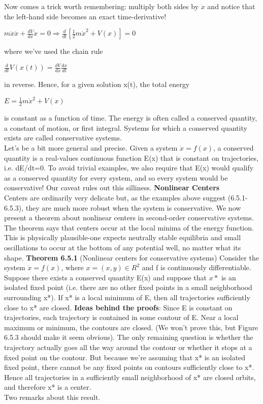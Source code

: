 \documentclass{article}
\newcommand\tab[1][1cm]{\hspace*{#1}}
\begin{document}
Now comes a trick worth remembering: multiply both sides by $\dot{x}$ and notice that the left-hand side becomes an exact time-derivative! 
\begin{center}
$m\dot{x}\ddot{x}+\frac{dV}{dx}\dot{x}=0 \Rightarrow \frac{d}{dt}[\frac{1}{2}m\dot{x}^{2}+V(x)]=0$
\end{center}

where we've used the chain rule
\begin{center}
$\frac{d}{dt}V(x(t))=\frac{dV}{dx}\frac{dx}{dt}$
\end{center}
in reverse. Hence, for a given solution x(t), the total energy
\begin{center}
$E=\frac{1}{2}m\dot{x}^{2}+V(x)$
\end{center}
is constant as a function of time. The energy is often called a conserved quantity, a constant of motion, or first integral. Systems for which a conserved quantity exists are called conservative systems. \\ \tab
Let's be a bit more general and precise. Given a system $\dot{x}=f(x)$, a conserved quantity is a real-values continuous function E(x) that is constant on trajectories, i.e. dE/dt=0. To avoid trivial examples, we also require that E(x) would qualify as a conserved quantity for every system, and so every system would be conservative! Our caveat rules out this silliness. 
\textbf {Nonlinear Centers} \\ \tab
Centers are ordinarily very delicate but, as the examples above suggest (6.5.1-6.5.3), they are much more robust when the system is conservative. We now present a theorem about nonlinear centers in second-order conservative systems. \\ \tab
The theorem says that centers occur at the local minima of the energy function. This is physically plausible-one expects neutrally stable equilibria and small oscillations to occur at the bottom of any potential well, no matter what its shape. 
\textbf {Theorem 6.5.1} (Nonlinear centers for conservative systems) Consider the system $\dot{x}=f(x)$, where $x=(x,y)\in R^{2}$ and f is continuously differentiable. Suppose there exists a conserved quantity E(x) and suppose that $x*$ is an isolated fixed point (i.e. there are no other fixed points in a small neighborhood surrounding x*). If x* is a local minimum of E, then all trajectories sufficiently close to x* are closed. 
\textbf {Ideas behind the proofs}: Since E is constant on trajectories, each trajectory is contained in some contour of E. Near a local maximum or minimum, the contours are closed. (We won't prove this, but Figure 6.5.3 should make it seem obvious). The only remaining question is whether the trajectory actually goes all the way around the contour or whether it stops at a fixed point on the contour. But because we're assuming that x* is an isolated fixed point, there cannot be any fixed points on contours sufficiently close to x*. Hence all trajectories in a sufficiently small neighborhood of x* are closed orbits, and therefore x* is a center. \\ \tab Two remarks about this result. 
\end{document}
